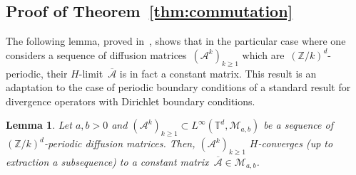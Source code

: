 \documentclass{article}
\newtheorem{lemma}{Lemma}
\renewcommand{\geq}{\geqslant}
\def\Z{\mathbb{Z}}
\newcommand{\A}{\mathcal{A}}
\renewcommand{\dim}{d}
\begin{document}
\subsection{Proof of Theorem~\ref{thm:commutation}}
\label{app:thm:commutation}


The following lemma, proved in~, shows that in the particular case where one considers a sequence of diffusion matrices~$(\A^k)_{k \geq 1}$ which are~$(\Z/k)^\dim$-periodic, their $H$-limit~$\overline{\A}$ is in fact a constant matrix. This result is an adaptation to the case of periodic boundary conditions of a standard result for divergence operators with Dirichlet boundary conditions.

\begin{lemma}
  \label{lem:Hcvg-constant}
  Let $a,b>0$ and $(\A^k)_{k\geq 1} \subset L^\infty(\mathbb{T}^\dim,\mathcal{M}_{a,b})$ be a sequence of $(\Z/k)^\dim$-periodic diffusion matrices. Then, $(\A^k)_{k\geq 1}$ $H$-converges (up to extraction a subsequence) to a constant matrix~$\overline{\A}\in \mathcal{M}_{a,b}$.
\end{lemma}
\end{document}
